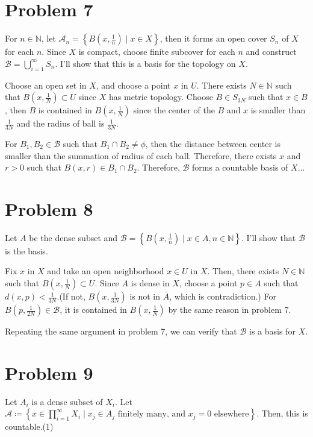 \documentclass{article}
\begin{document}
\section*{Problem 7}
For $n\in \mathbb{N}$, let $\mathcal{A}_n=\left\{B\left(x, \frac{1}{n}\right)\mid x\in X\right\}$, then it forms an open cover $S_n$ of $X$ for each $n$. Since $X$ is compact, choose finite subcover for each $n$ and construct $\mathcal{B}=\bigcup_{i=1}^\infty S_n$. I'll show that this is a basis for the topology on $X$.

Choose an open set in $X$, and choose a point $x$ in $U$. There exists $N\in \mathbb{N}$ such that $B\left(x, \frac{1}{N}\right)\subset U$ since $X$ has metric topology. Choose $B\in S_{3N}$ such that $x\in B$, then $B$ is contained in $B\left(x, \frac{1}{N}\right)$ since the center of the $B$ and $x$ is smaller than $\frac{1}{3N}$ and the radius of ball is $\frac{1}{3N}$.

For $B_1,B_2\in \mathcal{B}$ such that $B_1\cap B_2\neq \phi$, then the distance between center is smaller than the summation of radius of each ball. Therefore, there exists $x$ and $r>0$ such that $B(x, r)\in B_1\cap B_2$. Therefore, $\mathcal{B}$ forms a countable basis of $X$...
\section*{Problem 8}
Let $A$ be the dense subset and $\mathcal{B}=\left\{B\left(x, \frac{1}{n}\right)\mid x\in A,n\in \mathbb{N}\right\}$. I'll show that $\mathcal{B}$ is the basis.

Fix $x$ in $X$ and take an open neighborhood $x\in U$ in $X$. Then, there exists $N\in \mathbb{N}$ such that $B\left(x,\frac{1}{N}\right)\subset U$. Since $A$ is dense in $X$, choose a point $p\in A$ such that $d(x,p)<\frac{1}{3N}$.(If not, $B\left(x, \frac{1}{3N}\right)$ is not in $\overline{A}$, which is contradiction.) For $B\left(p, \frac{1}{2N}\right)\in \mathcal{B}$, it is contained in $B\left(x,\frac{1}{N}\right)$ by the same reason in problem 7.

Repeating the same argument in problem 7, we can verify that $\mathcal{B}$ is a basis for $X$.
\section*{Problem 9}
Let $A_i$ is a dense subset of $X_i$. Let $\mathcal{A}\coloneqq\left\{x\in \prod_{i=1}^\infty X_i \mid x_j\in A_j \text{ finitely many, and } x_j=0 \text{ elsewhere}\right\}$. Then, this is countable.(1)
\end{document}
